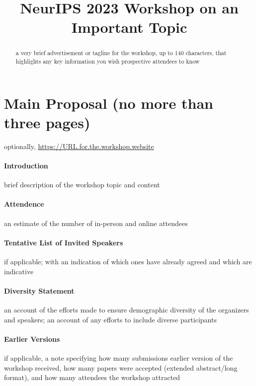 \documentclass{article}
\title{NeurIPS 2023 Workshop on an Important Topic}
\begin{document}
\maketitle

\vspace*{-5em} %

\begin{abstract}
  a very brief advertisement or tagline for the workshop, up to 140 characters, that highlights any key information you wish prospective attendees to know
\end{abstract}

\section*{Main Proposal (no more than three pages)}
\begin{center}
    optionally, \url{https://URL.for.the.workshop.website}
\end{center}
\paragraph{Introduction} brief description of the workshop topic and content

\paragraph{Attendence} an estimate of the number of in-person and online attendees

\paragraph{Tentative List of Invited Speakers}
if applicable; with an indication of which ones have already agreed and which are indicative

\paragraph{Diversity Statement}

an account of the efforts made to ensure demographic diversity of the organizers and speakers; an account of any efforts to include diverse participants

\paragraph{Earlier Versions}

if applicable, a note specifying how many submissions earlier version of the workshop received, how many papers were accepted (extended abstract/long format), and how many attendees the workshop attracted
\end{document}
